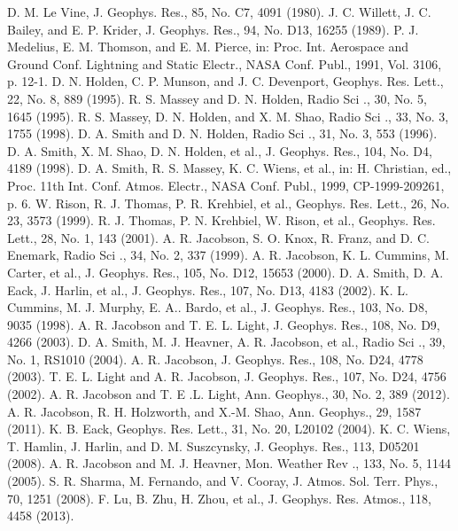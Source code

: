 \documentclass[a4paper, 12pt, onecolumn,singlespacing]{article}
\begin{document}
	\begin{thebibliography}{99}
\bibitem{} D. M. Le Vine, J. Geophys. Res., 85, No. C7, 4091 (1980).
\bibitem{} J. C. Willett, J. C. Bailey, and E. P. Krider, J. Geophys. Res., 94, No. D13, 16255 (1989).
\bibitem{} P. J. Medelius, E. M. Thomson, and E. M. Pierce, in: Proc. Int. Aerospace and Ground Conf. Lightning	and Static Electr., NASA Conf. Publ., 1991, Vol. 3106, p. 12-1.
\bibitem{} D. N. Holden, C. P. Munson, and J. C. Devenport, Geophys. Res. Lett., 22, No. 8, 889 (1995).
\bibitem{} R. S. Massey and D. N. Holden, Radio Sci ., 30, No. 5, 1645 (1995).
\bibitem{} R. S. Massey, D. N. Holden, and X. M. Shao, Radio Sci ., 33, No. 3, 1755 (1998).
\bibitem{} D. A. Smith and D. N. Holden, Radio Sci ., 31, No. 3, 553 (1996).
\bibitem{} D. A. Smith, X. M. Shao, D. N. Holden, et al., J. Geophys. Res., 104, No. D4, 4189 (1998).
\bibitem{} D. A. Smith, R. S. Massey, K. C. Wiens, et al., in: H. Christian, ed., Proc. 11th Int. Conf. Atmos. Electr., NASA Conf. Publ., 1999, CP-1999-209261, p. 6.
\bibitem{} W. Rison, R. J. Thomas, P. R. Krehbiel, et al., Geophys. Res. Lett., 26, No. 23, 3573 (1999).
\bibitem{} R. J. Thomas, P. N. Krehbiel, W. Rison, et al., Geophys. Res. Lett., 28, No. 1, 143 (2001).
\bibitem{} A. R. Jacobson, S. O. Knox, R. Franz, and D. C. Enemark, Radio Sci ., 34, No. 2, 337 (1999).
\bibitem{} A. R. Jacobson, K. L. Cummins, M. Carter, et al., J. Geophys. Res., 105, No. D12, 15653 (2000).
\bibitem{} D. A. Smith, D. A. Eack, J. Harlin, et al., J. Geophys. Res., 107, No. D13, 4183 (2002).
\bibitem{} K. L. Cummins, M. J. Murphy, E. A.. Bardo, et al., J. Geophys. Res., 103, No. D8, 9035 (1998).
\bibitem{} A. R. Jacobson and T. E. L. Light, J. Geophys. Res., 108, No. D9, 4266 (2003).
\bibitem{} D. A. Smith, M. J. Heavner, A. R. Jacobson, et al., Radio Sci ., 39, No. 1, RS1010 (2004).
\bibitem{} A. R. Jacobson, J. Geophys. Res., 108, No. D24, 4778 (2003).
\bibitem{} T. E. L. Light and A. R. Jacobson, J. Geophys. Res., 107, No. D24, 4756 (2002).
\bibitem{} A. R. Jacobson and T. E .L. Light, Ann. Geophys., 30, No. 2, 389 (2012).
\bibitem{} A. R. Jacobson, R. H. Holzworth, and X.-M. Shao, Ann. Geophys., 29, 1587 (2011).
\bibitem{} K. B. Eack, Geophys. Res. Lett., 31, No. 20, L20102 (2004).
\bibitem{} K. C. Wiens, T. Hamlin, J. Harlin, and D. M. Suszcynsky, J. Geophys. Res., 113, D05201 (2008).
\bibitem{} A. R. Jacobson and M. J. Heavner, Mon. Weather Rev ., 133, No. 5, 1144 (2005).
\bibitem{} S. R. Sharma, M. Fernando, and V. Cooray, J. Atmos. Sol. Terr. Phys., 70, 1251 (2008).
\bibitem{} F. Lu, B. Zhu, H. Zhou, et al., J. Geophys. Res. Atmos., 118, 4458 (2013).

\end{thebibliography}
\end{document}
